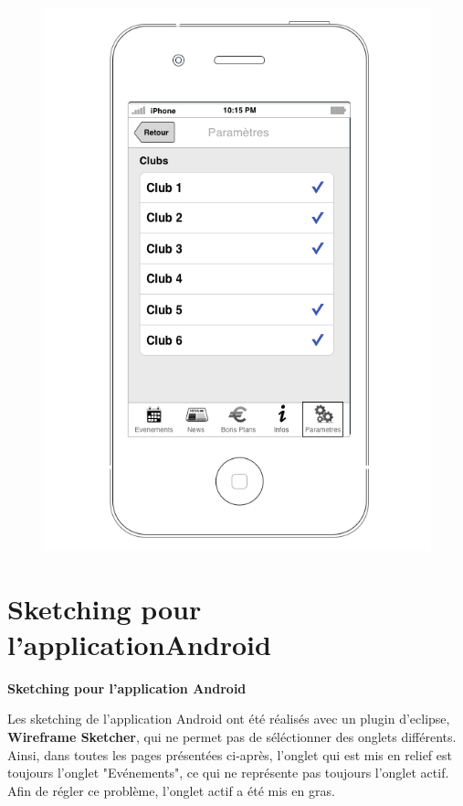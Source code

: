 \documentclass[a4paper, 11px]{article}
\begin{document}
\begin{figure}[htbp]
\begin{minipage}[c]{.50\linewidth}
\begin{center}
			\includegraphics[scale=0.3]{../../Sketch/iOS/parametres_detail.png}
		\end{center}
	\end{minipage}
\end{figure}
\vfill
\clearpage

\section{Sketching pour l'applicationAndroid}
\label{sketchAndroid}

\textbf{Sketching pour l'application Android}

Les sketching de l'application Android ont été réalisés avec un plugin d'eclipse, \textbf{Wireframe Sketcher}, qui ne permet pas de séléctionner des onglets différents. Ainsi, dans toutes les pages présentées ci-après, l'onglet qui est mis en relief est toujours l'onglet "Evénements", ce qui ne représente pas toujours l'onglet actif. Afin de régler ce problème, l'onglet actif a été mis en gras.
\end{document}
